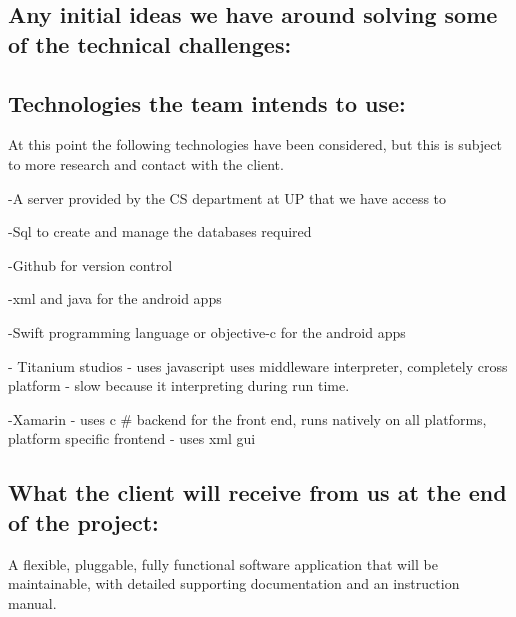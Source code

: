 \documentclass[hidelinks, 12pt, oneside]{article}
\begin{document}
\subsection{Any initial ideas we have around solving some of the technical challenges:}



\subsection{Technologies the team intends to use: }
 

At this point the following technologies have been considered, but this is subject to more research and contact with the client. 

-A server provided by the CS department at UP that we have access to

-Sql to create and manage the databases required 

-Github for version control 
 
-xml and java for the android apps

-Swift programming language or objective-c for the android apps

- Titanium studios - uses javascript uses middleware interpreter, completely cross platform - slow because it interpreting during run time. 

-Xamarin - uses c # backend for the front end, runs natively on all platforms, platform specific frontend - uses xml gui 


\subsection{What the client will receive from us at the end of the project:}

A flexible, pluggable, fully functional software application  that will be maintainable, with detailed supporting documentation and an instruction manual.
\end{document}
